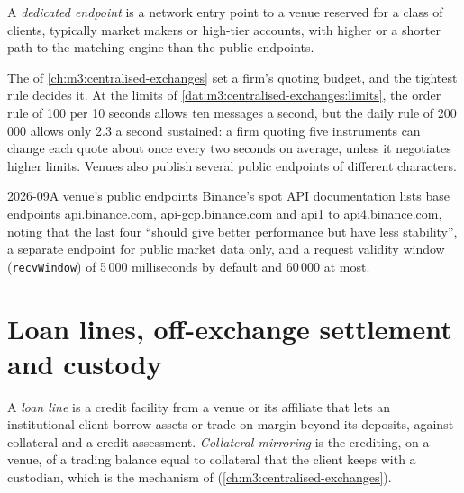 \begin{definition}\label{def:m3:getting-access-crypto-venues:endpoint}
A \emph{dedicated endpoint} is a network entry point to a venue reserved for a class of clients, typically market makers or
high-tier accounts, with higher  or a shorter path to the matching engine than the public endpoints.
\end{definition}

The  of \cref{ch:m3:centralised-exchanges} set a firm's quoting budget, and the tightest rule decides it. At the limits of
\cref{dat:m3:centralised-exchanges:limits}, the order rule of 100 per 10 seconds allows ten messages a second, but the daily rule of 200\,000 allows
only 2.3 a second sustained: a firm quoting five instruments can change each quote about once every two seconds on average, unless it negotiates
higher limits. Venues also publish several public endpoints of different characters.

\begin{dated}{2026-09}{A venue's public endpoints}\label{dat:m3:getting-access-crypto-venues:endpoints}
Binance's spot API documentation lists base endpoints api.binance.com, api-gcp.binance.com and api1 to api4.binance.com, noting that the last four
``should give better performance but have less stability'', a separate endpoint for public market data only, and a request validity window
(\texttt{recvWindow}) of 5\,000 milliseconds by default and 60\,000 at most.
\end{dated}

\section{Loan lines, off-exchange settlement and custody}

\begin{definition}\label{def:m3:getting-access-crypto-venues:loan}
A \emph{loan line} is a credit facility from a venue or its affiliate that lets an institutional client borrow assets or trade on margin
beyond its deposits, against collateral and a credit assessment. \emph{Collateral mirroring} is the crediting, on a venue, of a
trading balance equal to collateral that the client keeps with a custodian, which is the mechanism of 
(\cref{ch:m3:centralised-exchanges}).
\end{definition}

